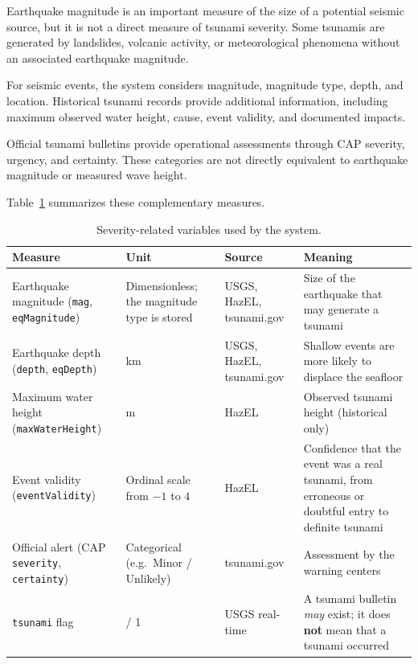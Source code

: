 \documentclass[a4paper,11pt,oneside]{book}
\begin{document}
Earthquake magnitude is an important measure of the size of a
potential seismic source, but it is not a direct measure of
tsunami severity. Some tsunamis are generated by landslides,
volcanic activity, or meteorological phenomena without an
associated earthquake magnitude.

For seismic events, the system considers magnitude, magnitude
type, depth, and location. Historical tsunami records provide
additional information, including maximum observed water height,
cause, event validity, and documented impacts.

Official tsunami bulletins provide operational assessments through
CAP severity, urgency, and certainty. These categories are not
directly equivalent to earthquake magnitude or measured wave height.

Table~\ref{tab:severity} summarizes these complementary measures.

\begin{table}[H]
\centering
\small
\noindent\begin{tabularx}{\textwidth}{@{}>{\raggedright\arraybackslash}p{3.5cm}>{\raggedright\arraybackslash}p{3.2cm}>{\raggedright\arraybackslash}p{2.6cm}>{\raggedright\arraybackslash}X@{}}
\toprule
Measure & Unit & Source & Meaning \\
\midrule
Earthquake magnitude (\texttt{mag}, \texttt{eqMagnitude}) & Dimensionless; the magnitude type is stored & USGS, HazEL, tsunami.gov & Size of the earthquake that may generate a tsunami \\
Earthquake depth (\texttt{depth}, \texttt{eqDepth}) & km & USGS, HazEL, tsunami.gov & Shallow events are more likely to displace the seafloor \\
Maximum water height (\texttt{maxWaterHeight}) & m & HazEL & Observed tsunami height (historical only) \\
Event validity (\texttt{eventValidity}) & Ordinal scale from $-1$ to $4$ & HazEL & Confidence that the event was a real tsunami, from erroneous or doubtful entry to definite tsunami \\
Official alert (CAP \texttt{severity}, \texttt{certainty}) & Categorical (e.g.\ Minor / Unlikely) & tsunami.gov & Assessment by the warning centers \\
\texttt{tsunami} flag & 0 / 1 & USGS real-time & A tsunami bulletin \emph{may} exist; it does \textbf{not} mean that a tsunami occurred \\
\bottomrule
\end{tabularx}
\caption{Severity-related variables used by the system.}
\label{tab:severity}
\end{table}
\end{document}

